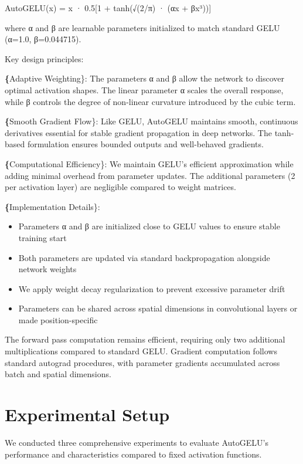 \documentclass[10pt]{article}
\begin{document}
AutoGELU(x) = x · 0.5[1 + tanh(√(2/π) · (αx + βx³))]

where α and β are learnable parameters initialized to match standard GELU (α=1.0, β=0.044715).

Key design principles:

\textbf\{Adaptive Weighting\}: The parameters α and β allow the network to discover optimal activation shapes. The linear parameter α scales the overall response, while β controls the degree of non-linear curvature introduced by the cubic term.

\textbf\{Smooth Gradient Flow\}: Like GELU, AutoGELU maintains smooth, continuous derivatives essential for stable gradient propagation in deep networks. The tanh-based formulation ensures bounded outputs and well-behaved gradients.

\textbf\{Computational Efficiency\}: We maintain GELU's efficient approximation while adding minimal overhead from parameter updates. The additional parameters (2 per activation layer) are negligible compared to weight matrices.

\textbf\{Implementation Details\}:
\begin{itemize}
\item Parameters α and β are initialized close to GELU values to ensure stable training start
\item Both parameters are updated via standard backpropagation alongside network weights
\item We apply weight decay regularization to prevent excessive parameter drift
\item Parameters can be shared across spatial dimensions in convolutional layers or made position-specific
\end{itemize}

The forward pass computation remains efficient, requiring only two additional multiplications compared to standard GELU. Gradient computation follows standard autograd procedures, with parameter gradients accumulated across batch and spatial dimensions.

\section{Experimental Setup}

We conducted three comprehensive experiments to evaluate AutoGELU's performance and characteristics compared to fixed activation functions.
\end{document}
